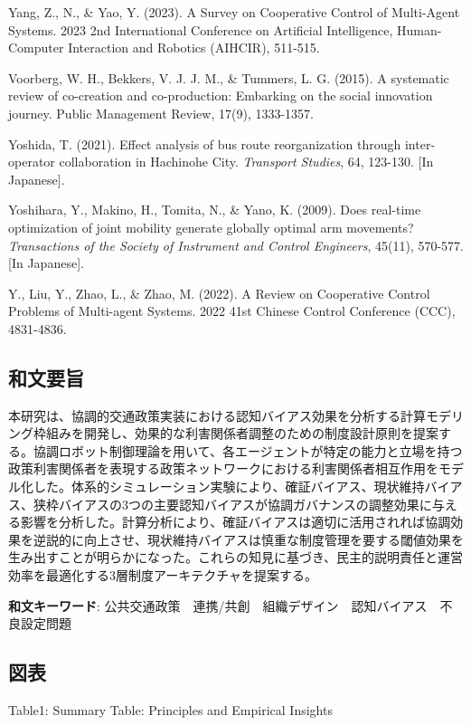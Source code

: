Yang, Z., N., \& Yao, Y. (2023). A Survey on Cooperative Control of Multi-Agent Systems. 2023 2nd International Conference on Artificial Intelligence, Human-Computer Interaction and Robotics (AIHCIR), 511-515.

Voorberg, W. H., Bekkers, V. J. J. M., \& Tummers, L. G. (2015). A systematic review of co-creation and co-production: Embarking on the social innovation journey. Public Management Review, 17(9), 1333-1357.

Yoshida, T. (2021). Effect analysis of bus route reorganization through inter-operator collaboration in Hachinohe City. \emph{Transport Studies}, 64, 123-130. {[}In Japanese{]}.

Yoshihara, Y., Makino, H., Tomita, N., \& Yano, K. (2009). Does real-time optimization of joint mobility generate globally optimal arm movements? \emph{Transactions of the Society of Instrument and Control Engineers}, 45(11), 570-577. {[}In Japanese{]}.

Y., Liu, Y., Zhao, L., \& Zhao, M. (2022). A Review on Cooperative Control Problems of Multi-agent Systems. 2022 41st Chinese Control Conference (CCC), 4831-4836.

\subsection{和文要旨}\label{ux548cux6587ux8981ux65e8}

本研究は、協調的交通政策実装における認知バイアス効果を分析する計算モデリング枠組みを開発し、効果的な利害関係者調整のための制度設計原則を提案する。協調ロボット制御理論を用いて、各エージェントが特定の能力と立場を持つ政策利害関係者を表現する政策ネットワークにおける利害関係者相互作用をモデル化した。体系的シミュレーション実験により、確証バイアス、現状維持バイアス、狭枠バイアスの3つの主要認知バイアスが協調ガバナンスの調整効果に与える影響を分析した。計算分析により、確証バイアスは適切に活用されれば協調効果を逆説的に向上させ、現状維持バイアスは慎重な制度管理を要する閾値効果を生み出すことが明らかになった。これらの知見に基づき、民主的説明責任と運営効率を最適化する3層制度アーキテクチャを提案する。

\textbf{和文キーワード}: 公共交通政策　連携/共創　組織デザイン　認知バイアス　不良設定問題

\subsection{図表}\label{ux56f3ux8868}

Table1: Summary Table: Principles and Empirical Insights

